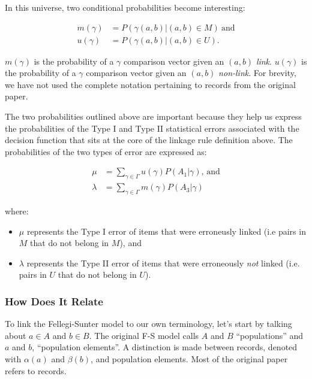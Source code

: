 \documentclass[11pt]{article}
\begin{document}
    In this universe, two conditional probabilities become interesting:

    \begin{align}
        m(\gamma)&=P(\gamma(a, b) | (a, b) \in M)~\textrm{and}\nonumber\\
        u(\gamma)&=P(\gamma(a, b) | (a, b) \in U)\textrm{.}\nonumber
    \end{align}

    \noindent
    $m(\gamma)$ is the probability of a $\gamma$ comparison vector given an
    $(a, b)$ \textit{link}.
    $u(\gamma)$ is the probability of a $\gamma$ comparison vector given an
    $(a, b)$ \textit{non-link}.
    For brevity, we have not used the complete notation pertaining to records
    from the original paper.

    The two probabilities outlined above are important because they help us
    express the probabilities of the Type I and Type II statistical errors
    associated with the decision function that sits at the core of the linkage
    rule definition above.
    The probabilities of the two types of error are expressed as:

    \begin{align}
        \mu&=\sum_{\gamma \in \varGamma}u(\gamma)P(A_1|\gamma)\textrm{,~and}\nonumber\\
        \lambda&=\sum_{\gamma \in \varGamma}m(\gamma)P(A_3|\gamma)\nonumber
    \end{align}

    where:

    \begin{itemize}
        \item $\mu$ represents the Type I error of items that were erroneusly
        linked (i.e pairs in $M$ that do not belong in $M$), and
        \item $\lambda$ represents the Type II error of items that were
        erroneously \textit{not} linked (i.e. pairs in $U$ that do not belong in
        $U$).
    \end{itemize}

    \subsubsection[fms-term]{How Does It Relate}\label{fsm-term}

    To link the Fellegi-Sunter model to our own terminology, let's start by
    talking about $a \in A$ and $b \in B$.
    The original F-S model calls $A$ and $B$ ``populations'' and $a$ and $b$,
    ``population elements''.
    A distinction is made between records, denoted with $\alpha(a)$ and
    $\beta(b)$, and population elements.
    Most of the original paper refers to records.
\end{document}
